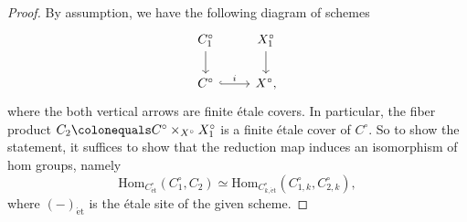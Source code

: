 \documentclass[11pt, letterpaper]{amsart}
\theoremstyle{plain}
\theoremstyle{definition}
\newcommand{\Hom}{\mathrm{Hom}}
\newcommand{\<}{\langle}
\renewcommand{\>}{\rangle}
\newcommand{\et}{\mathrm{{\acute{e}}t}}
\begin{document}
\begin{proof}
	By assumption, we have the following diagram of schemes
		\[\begin{tikzcd}
		{C_1^\circ} & {X_1^\circ} \\
		{C^\circ} & {X^\circ},
		\arrow[from=1-1, to=2-1]
		\arrow[from=1-2, to=2-2]
		\arrow["i", hook, from=2-1, to=2-2]
	\end{tikzcd}\]
    where the both vertical arrows are finite \'etale covers.
    In particular, the fiber product $C_2\colonequals C^\circ\times_{X^\circ} X_1^\circ$ is a finite \'etale cover of $C^\circ$.
    So to show the statement, it suffices to show that the reduction map induces an isomorphism of hom groups, namely
    \[
\Hom_{C^\circ_{\et}}(C_1^\circ , C_2) \simeq \Hom_{C^\circ_{k, \et}}(C_{1,k}^\circ , C_{2,k}^\circ),
    \]
    where $(-)_\et$ is the \'etale site of the given scheme.
    

\end{proof}
\end{document}
